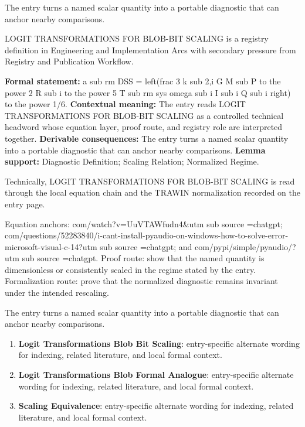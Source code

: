 The entry turns a named scalar quantity into a portable diagnostic that can anchor nearby comparisons.
\clearpage


\begingroup\small
{}
LOGIT TRANSFORMATIONS FOR BLOB-BIT SCALING is a registry definition in Engineering and Implementation Arcs with secondary pressure from Registry and Publication Workflow.

\begingroup\footnotesize\setlength{\emergencystretch}{3em}\sloppy
\textbf{Formal statement:} a sub rm DSS = left(frac 3 k sub 2,i G M sub P to the power 2 R sub i to the power 5 T sub rm sys omega sub i I sub i Q sub i right) to the power 1/6. \textbf{Contextual meaning:} The entry reads LOGIT TRANSFORMATIONS FOR BLOB-BIT SCALING as a controlled technical headword whose equation layer, proof route, and registry role are interpreted together. \textbf{Derivable consequences:} The entry turns a named scalar quantity into a portable diagnostic that can anchor nearby comparisons. \textbf{Lemma support:} Diagnostic Definition; Scaling Relation; Normalized Regime.\par
\endgroup

Technically, LOGIT TRANSFORMATIONS FOR BLOB-BIT SCALING is read through the local equation chain and the TRAWIN normalization recorded on the entry page.

Equation anchors: com/watch?v=UuVTAWfudn4\&utm sub source =chatgpt; com/questions/52283840/i-cant-install-pyaudio-on-windows-how-to-solve-error-microsoft-visual-c-14?utm sub source =chatgpt; and com/pypi/simple/pyaudio/?utm sub source =chatgpt. Proof route: show that the named quantity is dimensionless or consistently scaled in the regime stated by the entry. Formalization route: prove that the normalized diagnostic remains invariant under the intended rescaling.

The entry turns a named scalar quantity into a portable diagnostic that can anchor nearby comparisons.
\endgroup

\begin{enumerate}[leftmargin=1.6em,itemsep=6pt,topsep=4pt]
\item \textbf{Logit Transformations Blob Bit Scaling}: entry-specific alternate wording for indexing, related literature, and local formal context.
\item \textbf{Logit Transformations Blob Formal Analogue}: entry-specific alternate wording for indexing, related literature, and local formal context.
\item \textbf{Scaling Equivalence}: entry-specific alternate wording for indexing, related literature, and local formal context.
\end{enumerate}


